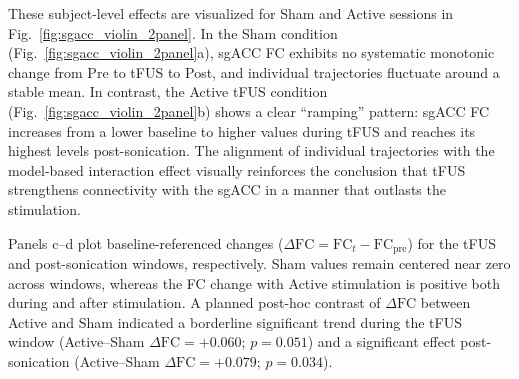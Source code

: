 These subject-level effects are visualized for Sham and Active sessions in Fig.~\ref{fig:sgacc_violin_2panel}. In the Sham condition (Fig.~\ref{fig:sgacc_violin_2panel}a), sgACC FC exhibits no systematic monotonic change from Pre to tFUS to Post, and individual trajectories fluctuate around a stable mean. In contrast, the Active tFUS condition (Fig.~\ref{fig:sgacc_violin_2panel}b) shows a clear ``ramping'' pattern: sgACC FC increases from a lower baseline to higher values during tFUS and reaches its highest levels post-sonication. The alignment of individual trajectories with the model-based interaction effect visually reinforces the conclusion that tFUS strengthens connectivity with the sgACC in a manner that outlasts the stimulation.

Panels c–d plot baseline-referenced changes ($\Delta\mathrm{FC}=\mathrm{FC}_t-\mathrm{FC}_{\mathrm{pre}}$) for the tFUS and post-sonication windows, respectively. Sham values remain centered near zero across windows, whereas the FC change with Active stimulation is positive both during and after stimulation. A planned post-hoc contrast of $\Delta\mathrm{FC}$ between Active and Sham indicated a borderline significant trend during the tFUS window (Active–Sham $\Delta\mathrm{FC}=+0.060$; $p=0.051$) and a significant effect post-sonication (Active–Sham $\Delta\mathrm{FC}=+0.079$; $p=0.034$). 


